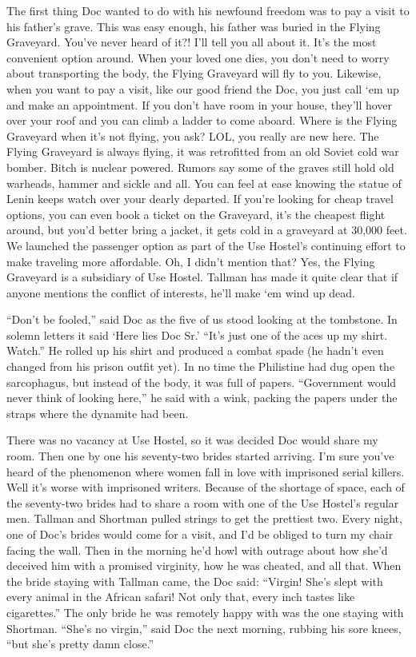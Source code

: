 \documentclass[oneside]{book}
\begin{document}
The first thing Doc wanted to do with his newfound freedom was to pay a visit to
his father's grave.  This was easy enough, his father was buried in the Flying
Graveyard.  You've never heard of it?!  I'll tell you all about it.  It's the most
convenient option around.  When your loved one dies, you don't need to worry about
transporting the body, the Flying Graveyard will fly to you.  Likewise, when you
want to pay a visit, like our good friend the Doc, you just call `em up and make
an appointment.  If you don't have room in your house, they'll hover over your roof
and you can climb a ladder to come aboard.  Where is the Flying Graveyard when it's
not flying, you ask?  LOL, you really are new here.  The Flying Graveyard is always
flying, it was retrofitted from an old Soviet cold war bomber.  Bitch is nuclear
powered.  Rumors say some of the
graves still hold old warheads, hammer and sickle and all.  You can feel at ease
knowing the statue of Lenin keeps watch over your dearly departed.  If
you're looking for cheap travel options, you can even book a ticket on the Graveyard,
it's the cheapest flight around, but you'd better bring a jacket, it gets cold in a
graveyard at 30,000 feet.  We launched the passenger option as part of the Use Hostel's
continuing effort to make traveling more affordable.  Oh, I didn't mention that?
Yes, the Flying Graveyard is a subsidiary of Use Hostel.  Tallman has made it quite clear
that if anyone mentions the conflict of interests, he'll make `em wind up dead.

``Don't be fooled,'' said Doc as the five of us stood looking at the tombstone.
In solemn letters it said `Here lies Doc Sr.'  ``It's just one of the aces up my shirt.
Watch.''  He rolled up his shirt and produced a combat spade (he hadn't even changed
from his prison outfit yet).  In no time the Philistine had dug open the sarcophagus,
but instead of the body, it was full of papers.  ``Government would never think of
looking here,'' he said with a wink, packing the papers under the straps where the
dynamite had been.

There was no vacancy at Use Hostel, so it was decided Doc would share my room.
Then one by one his seventy-two brides started arriving.  I'm sure you've heard of the
phenomenon where women fall in love with imprisoned serial killers.  Well it's
worse with imprisoned writers.  Because of the shortage of space, each of the seventy-two
brides had to share a room with one of the Use Hostel's regular men.  Tallman and
Shortman pulled strings to get the prettiest two.  Every night, one of Doc's
brides would come for a visit, and I'd be obliged to turn my chair facing the wall.
Then in the morning he'd howl with outrage about how she'd deceived him with a promised
virginity, how he was cheated, and all that.  When the bride staying with Tallman
came, the Doc said:  ``Virgin!  She's slept with every animal in the African safari!
Not only that, every inch tastes like cigarettes.''
The only bride he was remotely happy with was the one staying with Shortman.
``She's no virgin,'' said Doc the next morning, rubbing his sore knees,
``but she's pretty damn close.''
\end{document}
